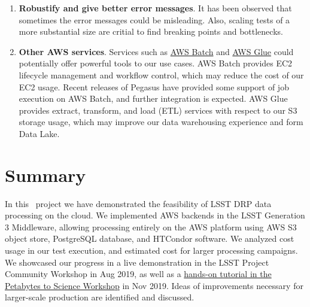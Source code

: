 \begin{enumerate}
\item \textbf{Robustify and give better error messages}.
It has been observed that sometimes the error messages could be misleading.
Also, scaling tests of a more substantial size are critial to find breaking points and bottlenecks.
\item \textbf{Other AWS services}.
Services such as \href{https://aws.amazon.com/batch/}{AWS Batch} and \href{https://aws.amazon.com/glue/}{AWS Glue} could potentially offer powerful tools to our use cases.
AWS Batch provides EC2 lifecycle management and workflow control, which may reduce the cost of our EC2 usage.
Recent releases of Pegasus have provided some support of job execution on AWS Batch, and further integration is expected.
AWS Glue provides extract, transform, and load (ETL) services with respect to our S3 storage usage, which may improve our data warehousing experience and form Data Lake.

\end{enumerate}

\section{Summary}

In this \poc~project we have demonstrated the feasibility of LSST DRP data processing on the cloud.
We implemented AWS backends in the LSST Generation 3 Middleware, allowing processing entirely on the AWS platform using AWS S3 object store, PostgreSQL database, and HTCondor software.
We analyzed cost usage in our test execution, and estimated cost for larger processing campaigns.
We showcased our progress in a live demonstration in the LSST Project Community Workshop in Aug 2019, as well as a \href{https://confluence.lsstcorp.org/display/DM/Tutorials+at+the+Kavli+workshop}{hands-on tutorial in the Petabytes to Science Workshop} in Nov 2019.
Ideas of improvements necessary for larger-scale production are identified and discussed.
